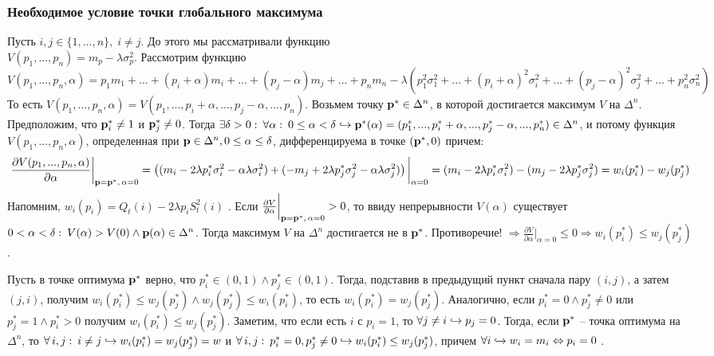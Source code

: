 \subsubsection{Необходимое условие точки глобального максимума}

Пусть $i,j \in \{1, ..., n\}, \; i \neq j$. До этого мы рассматривали функцию \\
$V(p_1, ..., p_n) = m_p - \lambda \sigma_p^2$. Рассмотрим функцию
\begin{dmath}
    V(p_1, ..., p_n, \alpha) = p_1 m_1 + ... + (p_i + \alpha) m_i + ... + (p_j - \alpha) m_j + ... + p_n m_n - \lambda (p_1^2 \sigma_1^2 + ... + (p_i + \alpha)^2 \sigma_i^2 + ... + (p_j - \alpha)^2 \sigma_j^2 + ... + p_n^2 \sigma_n^2)
\end{dmath}
То есть $V(p_1, ..., p_n, \alpha) = V(p_1, ..., p_i + \alpha, ..., p_j - \alpha, ..., p_n)$. Возьмем точку $\textbf{p}^* \in \Delta^n$, в которой достигается максимум $V$ на $\Delta^n$. Предположим, что $\textbf{p}_i^* \neq 1$ и $\textbf{p}_j^* \neq 0$. Тогда $\exists \delta > 0: \: \forall \alpha: \: 0 \leq \alpha < \delta \hookrightarrow \textbf{p}^*(\alpha) = (p_1^*, ..., p_i^* + \alpha, ..., p_j^* - \alpha, ..., p_n^*) \in \Delta^n$, и потому функция $V(p_1, ..., p_n, \alpha)$, определенная при $\textbf{p} \in \Delta^n, 0 \leq \alpha \leq \delta$, дифференцируема в точке $(\textbf{p}^*, 0)$ причем:
\begin{dmath}
    \frac{\partial V(p_1, ..., p_n, \alpha)}{\partial \alpha}\bigg|_{\tbf{p} = \tbf{p}^*, \, \alpha = 0} = \left( (m_i - 2\lambda p_i^* \sigma_i^2 - \alpha \lambda \sigma_i^2) + (-m_j + 2\lambda p_j^* \sigma_j^2 - \alpha \lambda \sigma_j^2) \right) \bigg|_{\alpha = 0}  = (m_i - 2 \lambda p_i^* \sigma_i^2) - (m_j - 2 \lambda p_j^* \sigma_j^2) = w_i(p_i^*) - w_j(p_j^*) 
\end{dmath}
Напомним, $w_i(p_i) = Q_t(i) - 2 \lambda p_i S_t^2(i)$ \label{eq:theory_w}. Если $\frac{\partial V}{\partial \alpha}\bigg|_{\textbf{p} = \textbf{p}^*, \, \alpha = 0} > 0$, то ввиду непрерывности $V(\alpha)$ существует $0 < \alpha < \delta: \: V(\alpha) > V(0) \land \textbf{p}(\alpha) \in \Delta^n$. Тогда максимум $V$ на $\Delta^n$ достигается не в $\textbf{p}^*$. Противоречие! $\Rightarrow \frac{\partial V}{\partial \alpha}\bigg|_{\alpha = 0} \leq 0 \Rightarrow w_i(p_i^*) \leq w_j(p_j^*)$.

\label{theory_fast_greedy_2} Пусть в точке оптимума $\textbf{p}^*$ верно, что $p_i^* \in (0,1) \land p_j^* \in (0,1)$. Тогда, подставив в предыдущий пункт сначала пару $(i,j)$, а затем $(j,i)$, получим $w_i(p_i^*) \leq w_j(p_j^*) \land w_j(p_j^*) \leq w_i(p_i^*)$, то есть $w_i(p_i^*) = w_j(p_j^*)$. Аналогично, если $p_i^* = 0 \land p_j^* \neq 0$ или $p_j^* = 1 \land p_i^* > 0$ получим $w_i(p_i^*) \leq w_j(p_j^*)$. Заметим, что если есть $i$ с $p_i = 1$, то $\forall j \neq i \hookrightarrow p_j = 0$. Тогда, если $\textbf{p}^*$ -- точка оптимума на $\Delta^n$, то $\forall \, i,j: \: i \neq j \hookrightarrow w_i(p_i^*) = w_j(p_j^*) = w$ и $\forall \, i,j: \: p_i^* = 0, p_j^* \neq 0 \hookrightarrow w_i(p_i^*) \leq w_j(p_j^*)$, причем $\forall i \hookrightarrow w_i = m_i \Leftrightarrow p_i = 0$ \label{eq:5}.

